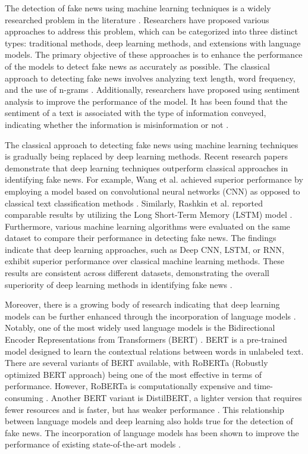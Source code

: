 The detection of fake news using machine learning techniques is a widely researched problem in the literature \autocite{Pathak2020}. Researchers have proposed various approaches to address this problem, which can be categorized into three distinct types: traditional methods, deep learning methods, and extensions with language models. The primary objective of these approaches is to enhance the performance of the models to detect fake news as accurately as possible. The classical approach to detecting fake news involves analyzing text length, word frequency, and the use of n-grams \autocite{Shu2017}. Additionally, researchers have proposed using sentiment analysis to improve the performance of the model. It has been found that the sentiment of a text is associated with the type of information conveyed, indicating whether the information is misinformation or not \autocite{rubin2016fake}.

The classical approach to detecting fake news using machine learning techniques is gradually being replaced by deep learning methods. Recent research papers demonstrate that deep learning techniques outperform classical approaches in identifying fake news. For example, Wang et al. achieved superior performance by employing a model based on convolutional neural networks (CNN) as opposed to classical text classification methods \autocite{wang-2017-liar}. Similarly, Rashkin et al. reported comparable results by utilizing the Long Short-Term Memory (LSTM) model \autocite{rashkin-etal-2017-truth}. Furthermore, various machine learning algorithms were evaluated on the same dataset to compare their performance in detecting fake news. The findings indicate that deep learning approaches, such as Deep CNN, LSTM, or RNN, exhibit superior performance over classical machine learning methods. These results are consistent across different datasets, demonstrating the overall superiority of deep learning methods in identifying fake news \autocite{IEEE2021}. 

Moreover, there is a growing body of research indicating that deep learning models can be further enhanced through the incorporation of language models \autocite{Conroy2015}. Notably, one of the most widely used language models is the Bidirectional Encoder Representations from Transformers (BERT) \autocite{Devlin2018}. BERT is a pre-trained model designed to learn the contextual relations between words in unlabeled text. There are several variants of BERT available, with RoBERTa (Robustly optimized BERT approach) being one of the most effective in terms of performance. However, RoBERTa is computationally expensive and time-consuming \autocite{Liu2019}. Another BERT variant is DistilBERT, a lighter version that requires fewer resources and is faster, but has weaker performance \autocite{Sanh2019}. This relationship between language models and deep learning also holds true for the detection of fake news. The incorporation of language models has been shown to improve the performance of existing state-of-the-art models \autocite{Khan2021, Joy2022}.

